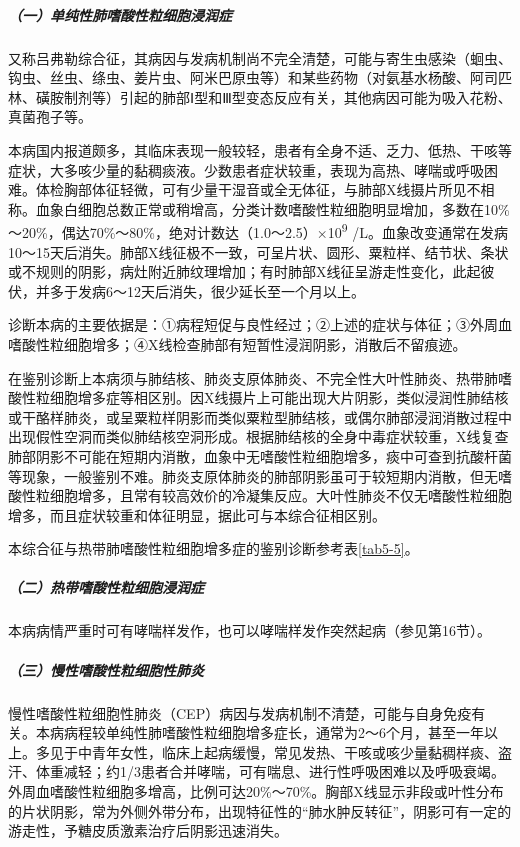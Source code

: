 \subparagraph{（一）单纯性肺嗜酸性粒细胞浸润症}

又称吕弗勒综合征，其病因与发病机制尚不完全清楚，可能与寄生虫感染（蛔虫、钩虫、丝虫、绦虫、姜片虫、阿米巴原虫等）和某些药物（对氨基水杨酸、阿司匹林、磺胺制剂等）引起的肺部Ⅰ型和Ⅲ型变态反应有关，其他病因可能为吸入花粉、真菌孢子等。

本病国内报道颇多，其临床表现一般较轻，患者有全身不适、乏力、低热、干咳等症状，大多咳少量的黏稠痰液。少数患者症状较重，表现为高热、哮喘或呼吸困难。体检胸部体征轻微，可有少量干湿音或全无体征，与肺部X线摄片所见不相称。血象白细胞总数正常或稍增高，分类计数嗜酸性粒细胞明显增加，多数在10\%～20\%，偶达70\%～80\%，绝对计数达（1.0～2.5）×10\textsuperscript{9}
/L。血象改变通常在发病10～15天后消失。肺部X线征极不一致，可呈片状、圆形、粟粒样、结节状、条状或不规则的阴影，病灶附近肺纹理增加；有时肺部X线征呈游走性变化，此起彼伏，并多于发病6～12天后消失，很少延长至一个月以上。

诊断本病的主要依据是：①病程短促与良性经过；②上述的症状与体征；③外周血嗜酸性粒细胞增多；④X线检查肺部有短暂性浸润阴影，消散后不留痕迹。

在鉴别诊断上本病须与肺结核、肺炎支原体肺炎、不完全性大叶性肺炎、热带肺嗜酸性粒细胞增多症等相区别。因X线摄片上可能出现大片阴影，类似浸润性肺结核或干酪样肺炎，或呈粟粒样阴影而类似粟粒型肺结核，或偶尔肺部浸润消散过程中出现假性空洞而类似肺结核空洞形成。根据肺结核的全身中毒症状较重，X线复查肺部阴影不可能在短期内消散，血象中无嗜酸性粒细胞增多，痰中可查到抗酸杆菌等现象，一般鉴别不难。肺炎支原体肺炎的肺部阴影虽可于较短期内消散，但无嗜酸性粒细胞增多，且常有较高效价的冷凝集反应。大叶性肺炎不仅无嗜酸性粒细胞增多，而且症状较重和体征明显，据此可与本综合征相区别。

本综合征与热带肺嗜酸性粒细胞增多症的鉴别诊断参考表\ref{tab5-5}。

\subparagraph{（二）热带嗜酸性粒细胞浸润症}

本病病情严重时可有哮喘样发作，也可以哮喘样发作突然起病（参见第16节）。

\subparagraph{（三）慢性嗜酸性粒细胞性肺炎}

慢性嗜酸性粒细胞性肺炎（CEP）病因与发病机制不清楚，可能与自身免疫有关。本病病程较单纯性肺嗜酸性粒细胞增多症长，通常为2～6个月，甚至一年以上。多见于中青年女性，临床上起病缓慢，常见发热、干咳或咳少量黏稠样痰、盗汗、体重减轻；约1/3患者合并哮喘，可有喘息、进行性呼吸困难以及呼吸衰竭。外周血嗜酸性粒细胞多增高，比例可达20\%～70\%。胸部X线显示非段或叶性分布的片状阴影，常为外侧外带分布，出现特征性的“肺水肿反转征”，阴影可有一定的游走性，予糖皮质激素治疗后阴影迅速消失。

